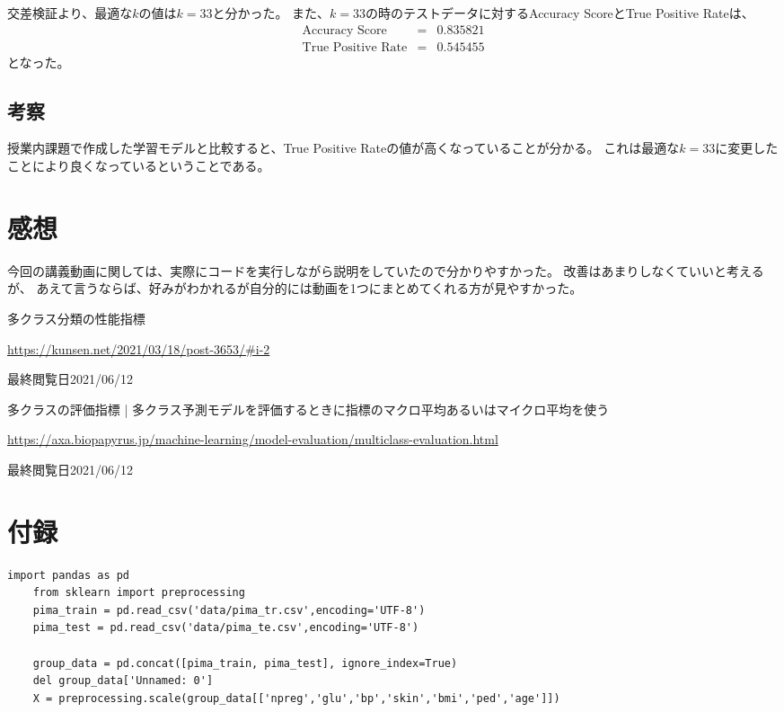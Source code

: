 \documentclass[12pt]{jarticle}
\begin{document}
交差検証より、最適な$k$の値は$k=33$と分かった。
また、$k=33$の時のテストデータに対するAccuracy ScoreとTrue Positive Rateは、
\begin{eqnarray}
    \text{Accuracy Score}&=& 0.835821 \nonumber \\
    \text{True Positive Rate}&=& 0.545455 \nonumber
\end{eqnarray}
となった。

\subsection{考察}
授業内課題で作成した学習モデルと比較すると、True Positive Rateの値が高くなっていることが分かる。
これは最適な$k=33$に変更したことにより良くなっているということである。

\section{感想}
今回の講義動画に関しては、実際にコードを実行しながら説明をしていたので分かりやすかった。
改善はあまりしなくていいと考えるが、
あえて言うならば、好みがわかれるが自分的には動画を1つにまとめてくれる方が見やすかった。

\begin{thebibliography}{99}
    \label{sannkoubunnkenn_chapter}
    多クラス分類の性能指標

    \url{https://kunsen.net/2021/03/18/post-3653/#i-2}

    最終閲覧日2021/06/12

    多クラスの評価指標 | 多クラス予測モデルを評価するときに指標のマクロ平均あるいはマイクロ平均を使う

    \url{https://axa.biopapyrus.jp/machine-learning/model-evaluation/multiclass-evaluation.html}

    最終閲覧日2021/06/12
\end{thebibliography}

\clearpage
\appendix
\section{付録}
\begin{lstlisting}[style = py,caption=授業内課題(1)]
    import pandas as pd
    from sklearn import preprocessing
    pima_train = pd.read_csv('data/pima_tr.csv',encoding='UTF-8')
    pima_test = pd.read_csv('data/pima_te.csv',encoding='UTF-8')
    
    group_data = pd.concat([pima_train, pima_test], ignore_index=True)
    del group_data['Unnamed: 0']
    X = preprocessing.scale(group_data[['npreg','glu','bp','skin','bmi','ped','age']])
\end{lstlisting}
\end{document}
